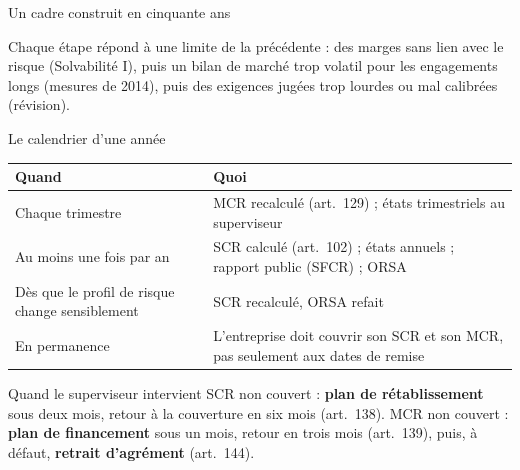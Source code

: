 \documentclass[10pt,aspectratio=169]{beamer}
\begin{document}
\begin{frame}{Un cadre construit en cinquante ans}
\begin{center}
\end{center}
\vspace{0.2cm}
\small Chaque étape répond à une limite de la précédente : des marges sans lien avec le risque
(Solvabilité I), puis un bilan de marché trop volatil pour les engagements longs (mesures de
2014), puis des exigences jugées trop lourdes ou mal calibrées (révision).
\end{frame}

\begin{frame}{Le calendrier d'une année}
\begin{table}
\centering
\small
\renewcommand{\arraystretch}{1.35}
\begin{tabular}{p{4cm}p{9cm}}
\toprule
\textbf{Quand} & \textbf{Quoi} \\
\midrule
Chaque trimestre & MCR recalculé (art.~129) ; états trimestriels au superviseur \\
Au moins une fois par an & SCR calculé (art.~102) ; états annuels ; rapport public (SFCR) ; ORSA \\
Dès que le profil de risque change sensiblement & SCR recalculé, ORSA refait \\
En permanence & L'entreprise doit couvrir son SCR et son MCR, pas seulement aux dates de remise \\
\bottomrule
\end{tabular}
\end{table}
\begin{block}{Quand le superviseur intervient}
\small
SCR non couvert : \textbf{plan de rétablissement} sous deux mois, retour à la couverture en six
mois (art.~138). MCR non couvert : \textbf{plan de financement} sous un mois, retour en trois mois
(art.~139), puis, à défaut, \textbf{retrait d'agrément} (art.~144).
\end{block}
\end{frame}
\end{document}
